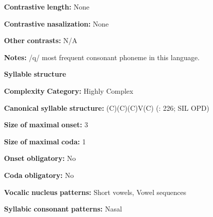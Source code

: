 \begin{styleBody}
\textbf{Contrastive} \textbf{length:} None
\end{styleBody}

\begin{styleBody}
\textbf{Contrastive} \textbf{nasalization:} None
\end{styleBody}

\begin{styleBody}
\textbf{Other} \textbf{contrasts:} N/A
\end{styleBody}

\begin{styleBody}
\textbf{Notes:} /q/ most frequent consonant phoneme in this language.
\end{styleBody}

\begin{styleBody}
\textbf{Syllable} \textbf{structure}
\end{styleBody}

\begin{styleBody}
\textbf{Complexity} \textbf{Category:} Highly Complex
\end{styleBody}

\begin{styleBody}
\textbf{Canonical} \textbf{syllable} \textbf{structure:} (C)(C)(C)V(C) (\citealt{Whitehead2004}: 226; SIL OPD)
\end{styleBody}

\begin{styleBody}
\textbf{Size} \textbf{of} \textbf{maximal} \textbf{onset:} 3
\end{styleBody}

\begin{styleBody}
\textbf{Size} \textbf{of} \textbf{maximal} \textbf{coda:} 1
\end{styleBody}

\begin{styleBody}
\textbf{Onset} \textbf{obligatory:} No
\end{styleBody}

\begin{styleBody}
\textbf{Coda} \textbf{obligatory:} No
\end{styleBody}

\begin{styleBody}
\textbf{Vocalic} \textbf{nucleus} \textbf{patterns:} Short vowels, Vowel sequences
\end{styleBody}

\begin{styleBody}
\textbf{Syllabic} \textbf{consonant} \textbf{patterns:} Nasal
\end{styleBody}


